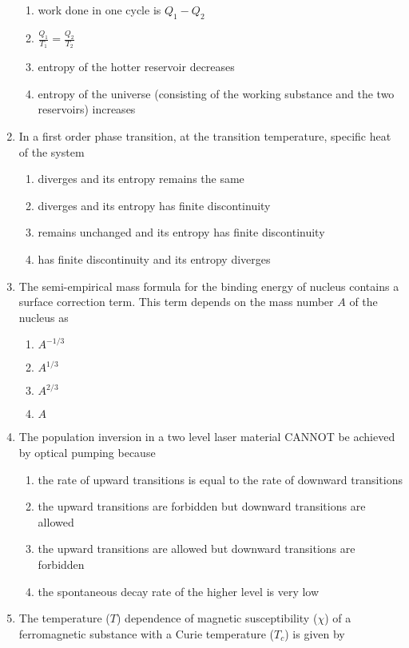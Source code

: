 \documentclass[journal]{IEEEtran}
\begin{document}
\begin{enumerate}
\begin{enumerate}
    \item work done in one cycle is $Q_1 - Q_2$
    \item $\frac{Q_1}{T_1} = \frac{Q_2}{T_2}$
    \item entropy of the hotter reservoir decreases
    \item entropy of the universe (consisting of the working substance and the two reservoirs) increases
\end{enumerate}
\item In a first order phase transition, at the transition temperature, specific heat of the system
\begin{enumerate}
    \item diverges and its entropy remains the same
    \item diverges and its entropy has finite discontinuity
    \item remains unchanged and its entropy has finite discontinuity
    \item has finite discontinuity and its entropy diverges
    \end{enumerate}
\item The semi-empirical mass formula for the binding energy of nucleus contains a surface correction term. This term depends on the mass number $A$ of the nucleus as
\begin{enumerate}
    \item $A^{-1/3}$
    \item $A^{1/3}$
    \item $A^{2/3}$
    \item $A$
\end{enumerate}
\item The population inversion in a two level laser material CANNOT be achieved by optical pumping because
\begin{enumerate}
    \item the rate of upward transitions is equal to the rate of downward transitions
    \item the upward transitions are forbidden but downward transitions are allowed
    \item the upward transitions are allowed but downward transitions are forbidden
    \item the spontaneous decay rate of the higher level is very low
\end{enumerate}
\item The temperature ($T$) dependence of magnetic susceptibility ($\chi$) of a ferromagnetic substance with a Curie temperature ($T_c$) is given by

\end{enumerate}
\end{document}
